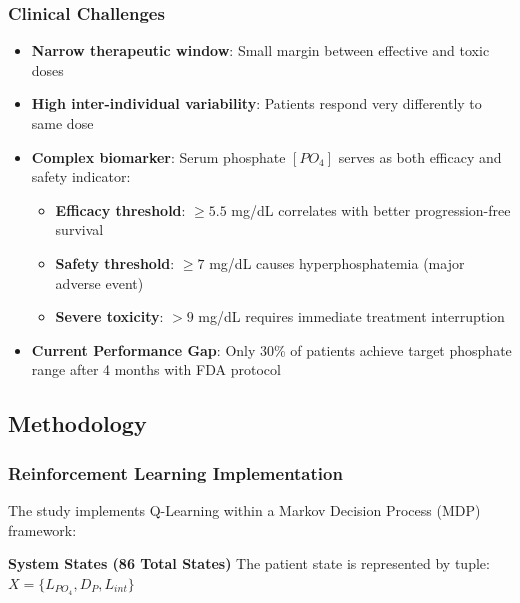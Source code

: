 \subsubsection{Clinical Challenges}
\begin{itemize}
    \item \textbf{Narrow therapeutic window}: Small margin between effective and toxic doses
    \item \textbf{High inter-individual variability}: Patients respond very differently to same dose
    \item \textbf{Complex biomarker}: Serum phosphate $[PO_4]$ serves as both efficacy and safety indicator:
    \begin{itemize}
        \item \textbf{Efficacy threshold}: $\geq 5.5$ mg/dL correlates with better progression-free survival
        \item \textbf{Safety threshold}: $\geq 7$ mg/dL causes hyperphosphatemia (major adverse event)  
        \item \textbf{Severe toxicity}: $> 9$ mg/dL requires immediate treatment interruption
    \end{itemize}
    \item \textbf{Current Performance Gap}: Only 30\% of patients achieve target phosphate range after 4 months with FDA protocol
\end{itemize}

\subsection{Methodology}

\subsubsection{Reinforcement Learning Implementation}
The study implements Q-Learning within a Markov Decision Process (MDP) framework:

\textbf{System States (86 Total States)}
The patient state is represented by tuple: $X = \{L_{PO_4}, D_P, L_{int}\}$

